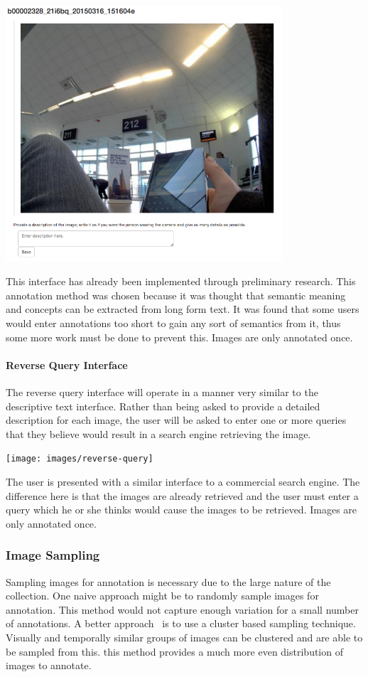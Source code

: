 \documentclass[12pt,a4paper]{article}
\begin{document}
\begin{center}
    \includegraphics[width=390px]{images/descriptive}
\end{center}

This interface has already been implemented through preliminary research. This annotation method was chosen because it was thought that semantic meaning and concepts can be extracted from long form text. It was found that some users would enter annotations too short to gain any sort of semantics from it, thus some more work must be done to prevent this. Images are only annotated once.
\pagebreak
\paragraph{Reverse Query Interface}
The reverse query interface will operate in a manner very similar to the descriptive text interface. Rather than being asked to provide a detailed description for each image, the user will be asked to enter one or more queries that they believe would result in a search engine retrieving the image.

\begin{center}
    \texttt{[image: images/reverse-query]}
\end{center}

The user is presented with a similar interface to a commercial search engine. The difference here is that the images are already retrieved and the user must enter a query which he or she thinks would cause the images to be retrieved. Images are only annotated once.
 
\subsubsection{Image Sampling}
Sampling images for annotation is necessary due to the large nature of the collection. One naive approach might be to randomly sample images for annotation. This method would not capture enough variation for a small number of annotations. A better approach~\cite{harry2016lifelog} is to use a cluster based sampling technique. Visually and temporally similar groups of images can be clustered and are able to be sampled from this. this method provides a much more even distribution of images to annotate.
\end{document}
